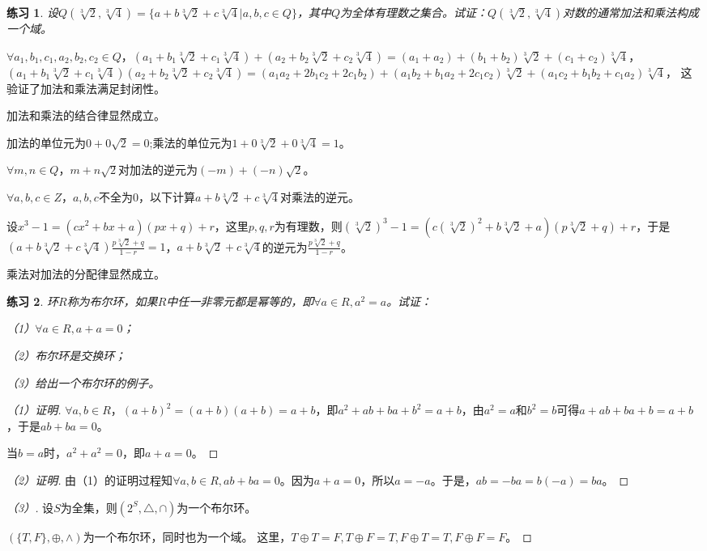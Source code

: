 \documentclass{article}
\newtheorem{Exercise}{练习}
\begin{document}
\begin{CJK*}{UTF8}{gbsn}
\begin{Exercise}
  设$Q(\sqrt[3]{2},\sqrt[3]{4})=\{a+b\sqrt[3]{2}+c\sqrt[3]{4}|a,b,c\in Q\}$，其中$Q$为全体有理数之集合。试证：$Q(\sqrt[3]{2},\sqrt[3]{4})$对数的通常加法和乘法构成一个域。  
\end{Exercise}
$\forall a_1,b_1,c_1,a_2,b_2,c_2\in Q$，$(a_1+b_1\sqrt[3]{2}+c_1\sqrt[3]{4})+(a_2+b_2\sqrt[3]{2}+c_2\sqrt[3]{4})=(a_1+a_2)+(b_1+b_2)\sqrt[3]{2}+(c_1+c_2)\sqrt[3]{4}$，$(a_1+b_1\sqrt[3]{2}+c_1\sqrt[3]{4})(a_2+b_2\sqrt[3]{2}+c_2\sqrt[3]{4})=(a_1a_2+2b_1c_2+2c_1b_2)+(a_1b_2+b_1a_2+2c_1c_2)\sqrt[3]{2}+(a_1c_2+b_1b_2+c_1a_2)\sqrt[3]{4}$，
  这验证了加法和乘法满足封闭性。

  加法和乘法的结合律显然成立。

  加法的单位元为$0+0\sqrt{2}=0$;乘法的单位元为$1+0\sqrt[3]{2}+0\sqrt[3]{4}=1$。

  $\forall m,n\in Q$，$m+n\sqrt{2}$对加法的逆元为$(-m)+(-n)\sqrt{2}$。


  $\forall a,b,c\in Z$，$a,b,c$不全为$0$，以下计算$a+b\sqrt[3]{2}+c\sqrt[3]{4}$对乘法的逆元。

  设$x^3-1=(cx^2+bx+a)(px+q)+r$，这里$p,q,r$为有理数，则$(\sqrt[3]{2})^3-1=(c(\sqrt[3]{2})^2+b\sqrt[3]{2}+a)(p\sqrt[3]{2}+q)+r$，于是$(a+b\sqrt[3]{2}+c\sqrt[3]{4})\frac{p\sqrt[3]{2}+q}{1-r}=1$，$a+b\sqrt[3]{2}+c\sqrt[3]{4}$的逆元为$\frac{p\sqrt[3]{2}+q}{1-r}$。

  乘法对加法的分配律显然成立。
\begin{Exercise}
  环$R$称为布尔环，如果$R$中任一非零元都是幂等的，即$\forall a\in R, a^2=a$。试证：

  （1）$\forall a\in R, a+a =0$；

  （2）布尔环是交换环；

  （3）给出一个布尔环的例子。
\end{Exercise}

\begin{proof}[（1）证明]
  $\forall a,b\in R$，$(a+b)^2=(a+b)(a+b)=a+b$，即$a^2+ab+ba+b^2=a+b$，由$a^2=a$和$b^2=b$可得$a+ab+ba+b=a+b$，于是$ab+ba=0$。

  当$b=a$时，$a^2+a^2=0$，即$a+a=0$。
\end{proof}

\begin{proof}[（2）证明]
  由（1）的证明过程知$\forall a,b\in R, ab+ba=0$。因为$a+a=0$，所以$a=-a$。于是，$ab=-ba=b(-a)=ba$。
\end{proof}

\begin{proof}[（3）]
  设$S$为全集，则$(2^S,\bigtriangleup,\cap)$为一个布尔环。

  $(\{T,F\},\oplus, \land)$为一个布尔环，同时也为一个域。
这里，$T\oplus T= F, T\oplus F = T, F\oplus T=T, F\oplus F=F$。
\end{proof}

\end{CJK*}
\end{document}
